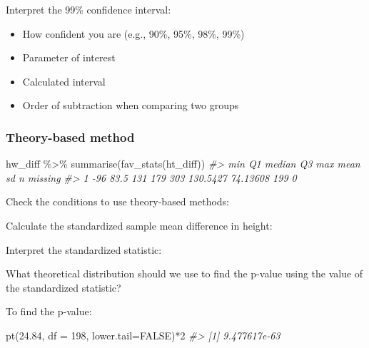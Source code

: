 \documentclass[
]{report}
\newenvironment{Shaded}{\begin{snugshade}}{\end{snugshade}}
\newcommand{\AttributeTok}[1]{\textcolor[rgb]{0.77,0.63,0.00}{#1}}
\newcommand{\CommentTok}[1]{\textcolor[rgb]{0.56,0.35,0.01}{\textit{#1}}}
\newcommand{\ConstantTok}[1]{\textcolor[rgb]{0.00,0.00,0.00}{#1}}
\newcommand{\DecValTok}[1]{\textcolor[rgb]{0.00,0.00,0.81}{#1}}
\newcommand{\FloatTok}[1]{\textcolor[rgb]{0.00,0.00,0.81}{#1}}
\newcommand{\FunctionTok}[1]{\textcolor[rgb]{0.00,0.00,0.00}{#1}}
\newcommand{\NormalTok}[1]{#1}
\newcommand{\SpecialCharTok}[1]{\textcolor[rgb]{0.00,0.00,0.00}{#1}}
\begin{document}
Interpret the 99\% confidence interval:

\begin{itemize}
\item
  How confident you are (e.g., 90\%, 95\%, 98\%, 99\%)
\item
  Parameter of interest
\item
  Calculated interval
\item
  Order of subtraction when comparing two groups
\end{itemize}

\vspace{0.8in}

\hypertarget{theory-based-method-3}{%
\subsubsection*{Theory-based method}\label{theory-based-method-3}}

\begin{Shaded}
\begin{Highlighting}[]
\NormalTok{hw\_diff }\SpecialCharTok{\%\textgreater{}\%}
    \FunctionTok{summarise}\NormalTok{(}\FunctionTok{fav\_stats}\NormalTok{(ht\_diff))}
\CommentTok{\#\textgreater{}   min   Q1 median  Q3 max     mean       sd   n missing}
\CommentTok{\#\textgreater{} 1 {-}96 83.5    131 179 303 130.5427 74.13608 199       0}
\end{Highlighting}
\end{Shaded}

Check the conditions to use theory-based methods:

\vspace{1in}

Calculate the standardized sample mean difference in height:

\vspace{1in}

Interpret the standardized statistic:

\vspace{0.8in}

What theoretical distribution should we use to find the p-value using the value of the standardized statistic?

\vspace{0.3in}

To find the p-value:

\begin{Shaded}
\begin{Highlighting}[]
\FunctionTok{pt}\NormalTok{(}\FloatTok{24.84}\NormalTok{, }\AttributeTok{df =} \DecValTok{198}\NormalTok{, }\AttributeTok{lower.tail=}\ConstantTok{FALSE}\NormalTok{)}\SpecialCharTok{*}\DecValTok{2}
\CommentTok{\#\textgreater{} [1] 9.477617e{-}63}
\end{Highlighting}
\end{Shaded}
\end{document}
